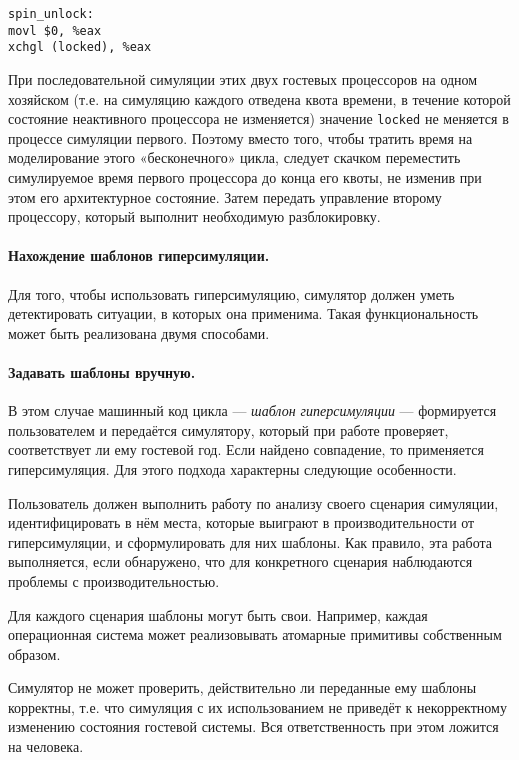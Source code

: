 \begin{lstlisting}
spin_unlock:
movl $0, %eax
xchgl (locked), %eax
\end{lstlisting}

При последовательной симуляции этих двух гостевых процессоров на одном хозяйском (т.е. на симуляцию каждого отведена квота времени, в течение которой состояние неактивного процессора не изменяется) значение \texttt{locked} не меняется в процессе симуляции первого. Поэтому вместо того, чтобы тратить время на моделирование этого «бесконечного» цикла, следует скачком переместить симулируемое время первого процессора до конца его квоты, не изменив при этом его архитектурное состояние. Затем передать управление второму процессору, который выполнит необходимую разблокировку.

\paragraph{Нахождение шаблонов гиперсимуляции.} Для того, чтобы использовать гиперсимуляцию, симулятор должен уметь детектировать ситуации, в которых она применима. Такая функциональность может быть реализована двумя способами.

\paragraph{Задавать шаблоны вручную.} В этом случае машинный код цикла --- \emph{шаблон гиперсимуляции} --- формируется пользователем и передаётся симулятору, который при работе проверяет, соответствует ли ему гостевой год. Если найдено совпадение, то применяется гиперсимуляция. Для этого подхода характерны следующие особенности.

\begin{itemize*}
    \item Пользователь должен выполнить работу по анализу своего сценария симуляции, идентифицировать в нём места, которые выиграют в производительности от гиперсимуляции, и сформулировать для них шаблоны. Как правило, эта работа выполняется, если обнаружено, что для конкретного сценария наблюдаются проблемы с производительностью. 
    \item Для каждого сценария шаблоны могут быть свои. Например, каждая операционная система может реализовывать атомарные примитивы собственным образом.
    \item Симулятор не может проверить, действительно ли переданные ему шаблоны корректны, т.е. что симуляция с их использованием не приведёт к некорректному изменению состояния гостевой системы. Вся ответственность при этом ложится на человека.
\end{itemize*}


